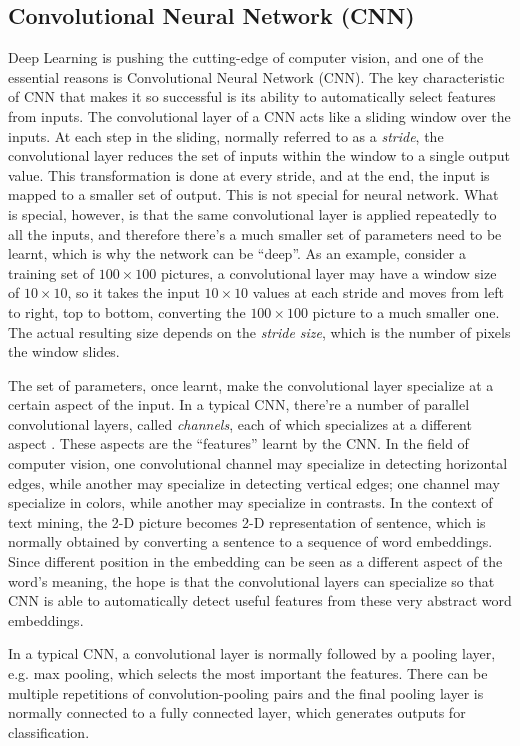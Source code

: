 \subsection{Convolutional Neural Network (CNN)}

Deep Learning is pushing the cutting-edge of computer vision, and one of the essential reasons is Convolutional Neural Network (CNN). The key characteristic of CNN that makes it so successful is its ability to automatically select features from inputs. The convolutional layer of a CNN acts like a sliding window over the inputs. At each step in the sliding, normally referred to as a {\em stride}, the convolutional layer reduces the set of inputs within the window to a single output value. This transformation is done at every stride, and at the end, the input is mapped to a smaller set of output. This is not special for neural network. What is special, however, is that the same convolutional layer is applied repeatedly to all the inputs, and therefore there's a much smaller set of parameters need to be learnt, which is why the network can be ``deep''. As an example, consider a training set of $100 \times 100$ pictures, a convolutional layer may have a window size of $10 \times 10$, so it takes the input $10 \times 10$ values at each stride and moves from left to right, top to bottom, converting the $100 \times 100$ picture to a much smaller one. The actual resulting size depends on the {\em stride size}, which is the number of pixels the window slides. 

The set of parameters, once learnt, make the convolutional layer specialize at a certain aspect of the input. In a typical CNN, there're a number of parallel convolutional layers, called {\em channels}, each of which specializes at a different aspect \cite{}. These aspects are the ``features'' learnt by the CNN. In the field of computer vision, one convolutional channel may specialize in detecting horizontal edges, while another may specialize in detecting vertical edges; one channel may specialize in colors, while another may specialize in contrasts. In the context of text mining, the 2-D picture becomes 2-D representation of sentence, which is normally obtained by converting a sentence to a sequence of word embeddings. Since different position in the embedding can be seen as a different aspect of the word's meaning, the hope is that the convolutional layers can specialize so that CNN is able to automatically detect useful features from these very abstract word embeddings. 

In a typical CNN, a convolutional layer is normally followed by a pooling layer, e.g. max pooling, which selects the most important the features. There can be multiple repetitions of convolution-pooling pairs and the final pooling layer is normally connected to a fully connected layer, which generates outputs for classification.
